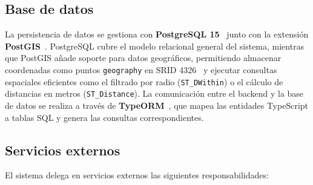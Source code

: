 \subsection{Base de datos}

La persistencia de datos se gestiona con \textbf{PostgreSQL 15}~\cite{postgresql15} junto con la extensión \textbf{PostGIS}~\cite{postgisdocs,obe2020postgis}. PostgreSQL cubre el modelo relacional general del sistema, mientras que PostGIS añade soporte para datos geográficos, permitiendo almacenar coordenadas como puntos \texttt{geography} en SRID 4326~\cite{wgs84} y ejecutar consultas espaciales eficientes como el filtrado por radio (\texttt{ST\_DWithin}) o el cálculo de distancias en metros (\texttt{ST\_Distance}). La comunicación entre el backend y la base de datos se realiza a través de \textbf{TypeORM}~\cite{typeorm}, que mapea las entidades TypeScript a tablas SQL y genera las consultas correspondientes.

\subsection{Servicios externos}

El sistema delega en servicios externos las siguientes responsabilidades:

